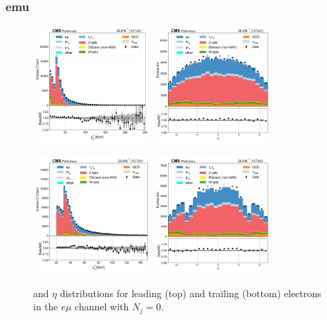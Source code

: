 \subsubsection{emu}

\begin{figure}[htb!]
    \centering
    \includegraphics[width=0.4\textwidth]{chapters/Analysis/sectionPlots/figures/data_mc_overlays/emu_2016_cat_eq0_eq0_a_signal_linear_lepton_lepton1_pt}
    \includegraphics[width=0.4\textwidth]{chapters/Analysis/sectionPlots/figures/data_mc_overlays/emu_2016_cat_eq0_eq0_a_signal_linear_lepton_lepton1_eta}

    \includegraphics[width=0.4\textwidth]{chapters/Analysis/sectionPlots/figures/data_mc_overlays/emu_2016_cat_eq0_eq0_a_signal_linear_lepton_lepton2_pt}
    \includegraphics[width=0.4\textwidth]{chapters/Analysis/sectionPlots/figures/data_mc_overlays/emu_2016_cat_eq0_eq0_a_signal_linear_lepton_lepton2_eta}
    \caption{\pt and $\eta$ distributions for leading (top) and trailing
    (bottom) electrons in the $e\mu$ channel with $N_{j} = 0$.}
    \label{fig:analysis:plots:emu_1_kinematic}
\end{figure}

